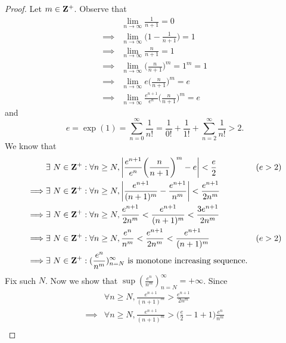\begin{proof}
    Let \(m \in \mathbf{Z}^+\).
    Observe that
    \begin{align*}
                 & \lim_{n \to \infty} \frac{1}{n + 1} = 0                                     \\
        \implies & \lim_{n \to \infty} \bigg(1 - \frac{1}{n + 1}\bigg) = 1                     \\
        \implies & \lim_{n \to \infty} \frac{n}{n + 1} = 1                                     \\
        \implies & \lim_{n \to \infty} \bigg(\frac{n}{n + 1}\bigg)^m = 1^m = 1                 \\
        \implies & \lim_{n \to \infty} e \bigg(\frac{n}{n + 1}\bigg)^m = e                     \\
        \implies & \lim_{n \to \infty} \frac{e^{n + 1}}{e^n} \bigg(\frac{n}{n + 1}\bigg)^m = e
    \end{align*}
    and
    \[
        e = \exp(1) = \sum_{n = 0}^\infty \frac{1}{n!} = \frac{1}{0!} + \frac{1}{1!} + \sum_{n = 2}^\infty \frac{1}{n!} > 2.
    \]
    We know that
    \begin{align*}
                 & \exists\ N \in \mathbf{Z}^+ : \forall n \geq N, \left\lvert\frac{e^{n + 1}}{e^n} \bigg(\frac{n}{n + 1}\bigg)^m - e\right\rvert < \frac{e}{2}         & (e > 2) \\
        \implies & \exists\ N \in \mathbf{Z}^+ : \forall n \geq N, \left\lvert\frac{e^{n + 1}}{(n + 1)^m} - \frac{e^{n + 1}}{n^m}\right\rvert < \frac{e^{n + 1}}{2 n^m}           \\
        \implies & \exists\ N \in \mathbf{Z}^+ : \forall n \geq N, \frac{e^{n + 1}}{2 n^m} < \frac{e^{n + 1}}{(n + 1)^m} < \frac{3 e^{n + 1}}{2 n^m}             \\
        \implies & \exists\ N \in \mathbf{Z}^+ : \forall n \geq N, \frac{e^n}{n^m} < \frac{e^{n + 1}}{2 n^m} < \frac{e^{n + 1}}{(n + 1)^m}             & (e > 2) \\
        \implies & \exists\ N \in \mathbf{Z}^+ : (\frac{e^n}{n^m})_{n = N}^\infty \text{ is monotone increasing sequence}.
    \end{align*}
    Fix such \(N\).
    Now we show that \(\sup(\frac{e^n}{n^m})_{n = N}^\infty = +\infty\).
    Since
    \begin{align*}
                 & \forall n \geq N, \frac{e^{n + 1}}{(n + 1)^m} > \frac{e^{n + 1}}{2 n^m}                                                                           \\
        \implies & \forall n \geq N, \frac{e^{n + 1}}{(n + 1)^m} > \bigg(\frac{e}{2} - 1 + 1\bigg) \frac{e^n}{n^m}                                                   \\

\end{align*}
\end{proof}
